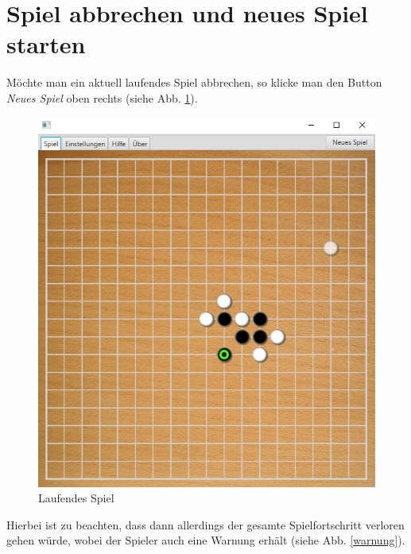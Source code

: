 \documentclass[11pt]{article}
\newcommand{\1}{{\mathds{1}}}
\newcommand{\imagewidth}{.4\textheight}%
\begin{document}
	\FloatBarrier
	\section{Spiel abbrechen und neues Spiel starten}
	
	Möchte man ein aktuell laufendes Spiel abbrechen, so klicke man den Button \textit{Neues Spiel} oben rechts (siehe Abb. \ref{spiel}).
	
	\begin{figure}[h]
		\centering
		\includegraphics[width=\imagewidth]{spiel.png}
		\caption{Laufendes Spiel}
		\label{spiel}
	\end{figure}
	
	Hierbei ist zu beachten, dass dann allerdings der gesamte Spielfortschritt verloren gehen würde, wobei der Spieler auch eine Warnung erhält (siehe Abb. \ref{warnung}).
	
\end{document}
